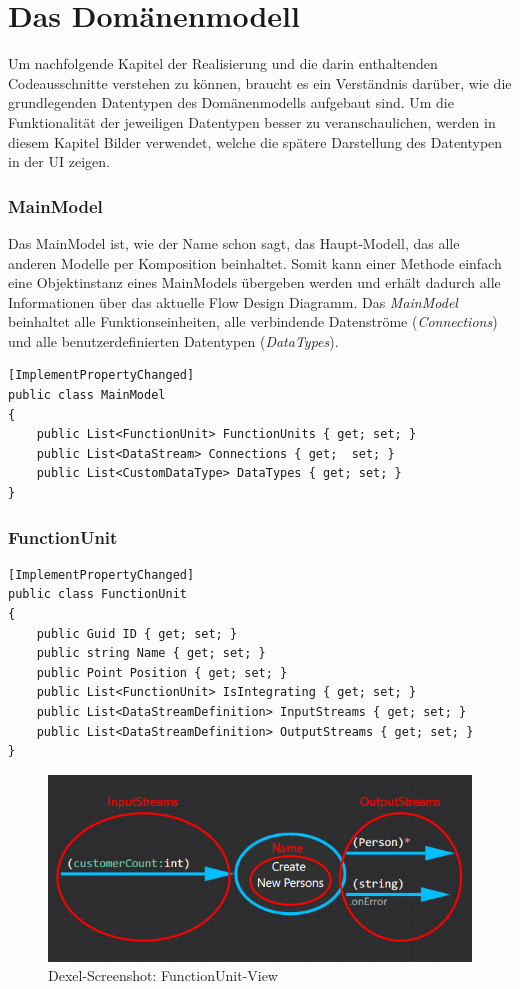 \section{Das Domänenmodell}

Um nachfolgende Kapitel der Realisierung und die darin enthaltenden
Codeausschnitte verstehen zu können, braucht es ein Verständnis darüber, wie die
grundlegenden Datentypen des Domänenmodells aufgebaut sind. Um die Funktionalität der
jeweiligen Datentypen besser zu veranschaulichen, werden in diesem Kapitel
Bilder verwendet, welche die spätere Darstellung des Datentypen in der UI zeigen.

\subsubsection{MainModel}

Das MainModel ist, wie der Name schon sagt, das Haupt-Modell, das alle
anderen Modelle per Komposition beinhaltet. Somit kann einer Methode einfach eine Objektinstanz
eines MainModels übergeben werden und erhält dadurch alle Informationen über das aktuelle Flow Design Diagramm. 
Das \textit{MainModel} beinhaltet alle Funktionseinheiten, alle verbindende
Datenströme (\textit{Connections}) und alle benutzerdefinierten Datentypen (\textit{DataTypes}).

\begin{lstlisting}[caption=MainModel Klasse]
[ImplementPropertyChanged]
public class MainModel
{
	public List<FunctionUnit> FunctionUnits { get; set; }
	public List<DataStream> Connections { get;  set; }
	public List<CustomDataType> DataTypes { get; set; } 
}
\end{lstlisting}

\subsubsection{FunctionUnit}


\begin{lstlisting}[caption=FunctionUnit Klasse]
[ImplementPropertyChanged]
public class FunctionUnit
{
	public Guid ID { get; set; }
	public string Name { get; set; }
	public Point Position { get; set; }
	public List<FunctionUnit> IsIntegrating { get; set; }
	public List<DataStreamDefinition> InputStreams { get; set; }
	public List<DataStreamDefinition> OutputStreams { get; set; }
}
\end{lstlisting}

	
	\begin{figure}[H]
		\centering
		\includegraphics[width=0.9\linewidth]{./img/FunctionUnitView.png} 
		\caption{Dexel-Screenshot: FunctionUnit-View}
	\end{figure}

